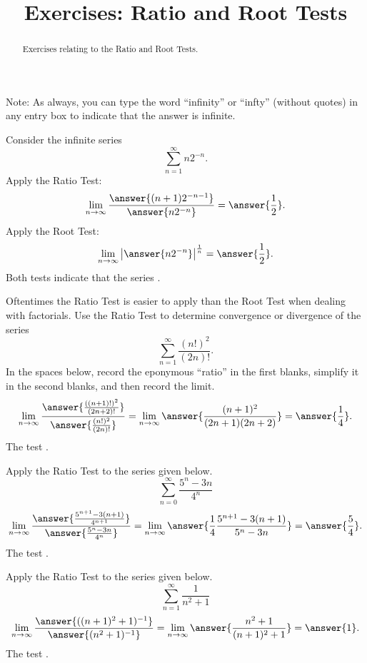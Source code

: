 \documentclass{ximera}
\title{Exercises: Ratio and Root Tests}
\begin{document}
\begin{abstract}
Exercises relating to the Ratio and Root Tests.
\end{abstract}
\maketitle


Note: As always, you can type the word ``infinity'' or ``infty'' (without quotes) in any entry box to indicate that the answer is infinite.

\begin{exercise}
Consider the infinite series
\[ \sum_{n=1}^\infty n 2^{-n}. \]
Apply the Ratio Test:
\[ \lim_{n \rightarrow \infty} \frac{\answer{(n+1) 2^{-n-1}}}{\answer{n 2^{-n}}} = \answer{\frac{1}{2}}. \]
Apply the Root Test:
\[ \lim_{n \rightarrow \infty} \left| \answer{n 2^{-n}} \right|^{\frac{1}{n}} = \answer{\frac{1}{2}}. \]
Both tests indicate that the series .
\end{exercise}

\begin{exercise}
Oftentimes the Ratio Test is easier to apply than the Root Test when dealing with factorials. Use the Ratio Test to determine convergence or divergence of the series
\[ \sum_{n=1}^\infty \frac{(n!)^2}{(2n)!}. \]
In the spaces below, record the eponymous ``ratio'' in the first blanks, simplify it in the second blanks, and then record the limit.
\[ \lim_{n \rightarrow \infty} \frac{\answer{\frac{((n+1)!)^2}{(2n+2)!}}}{\answer{\frac{(n!)^2}{(2n)!}}} = \lim_{n \rightarrow \infty} \answer{\frac{(n+1)^2}{(2n+1)(2n+2)}} = \answer{\frac{1}{4}}. \]
The test .
\end{exercise}

\begin{exercise}%
Apply the Ratio Test to the series given below.
\[ \sum_{n=0}^\infty \frac{5^n-3n}{4^n} \]
\[ \lim_{n \rightarrow \infty} \frac{\answer{\frac{5^{n+1}-3(n+1)}{4^{n+1}}}}{\answer{\frac{5^n-3n}{4^n}}} = \lim_{n \rightarrow \infty} \answer{\frac{1}{4} \frac{5^{n+1} - 3(n+1)}{5^n - 3n}} = \answer{\frac{5}{4}}. \]
The test .
\end{exercise}

\begin{exercise}
Apply the Ratio Test to the series given below.
\[ \sum_{n=1}^\infty \frac{1}{n^2+1} \]
\[ \lim_{n \rightarrow \infty} \frac{\answer{((n+1)^2+1)^{-1}}}{\answer{(n^2+1)^{-1}}} = \lim_{n \rightarrow \infty} \answer{\frac{n^2+1}{(n+1)^2+1}} = \answer{1}. \]
The test .
\end{exercise}
\end{document}
